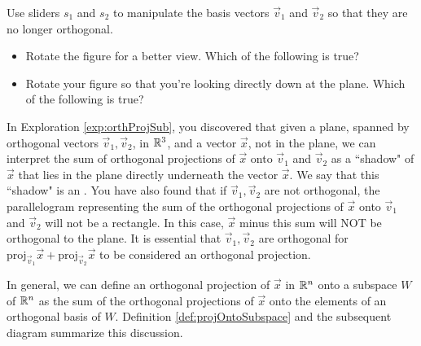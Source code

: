 \documentclass{ximera}
\begin{document}
\begin{exploration}
 \begin{question}
 Use sliders $s_1$ and $s_2$ to manipulate the basis vectors $\vec{v}_1$ and $\vec{v}_2$ so that they are no longer orthogonal.  

\begin{itemize}
 \item 
 Rotate the figure for a better view.  Which of the following is true?
 \begin{multipleChoice}
 \end{multipleChoice}
 \item
 Rotate your figure so that you're looking directly down at the plane. Which of the following is true?
 \begin{multipleChoice}
 \end{multipleChoice}
\end{itemize}
\end{question}
\end{exploration}

In Exploration \ref{exp:orthProjSub}, you discovered that given a plane, spanned by orthogonal vectors $\vec{v}_1,\vec{v}_2$, in $\mathbb{R}^3$, and a vector $\vec{x}$, not in the plane, we can interpret the sum of orthogonal projections of $\vec{x}$ onto $\vec{v}_1$ and $\vec{v}_2$ as a ``shadow" of $\vec{x}$ that lies in the plane directly underneath the vector $\vec{x}$. We say that this ``shadow" is an . You have also found that if $\vec{v}_1,\vec{v}_2$ are not orthogonal, the parallelogram representing the sum of the orthogonal projections of $\vec{x}$ onto $\vec{v}_1$ and $\vec{v}_2$ will not be a rectangle.  In this case, $\vec{x}$ minus this sum will NOT be orthogonal to the plane.  It is essential that $\vec{v}_1,\vec{v}_2$ are orthogonal for $\mbox{proj}_{\vec{v}_1}\vec{x}+\mbox{proj}_{\vec{v}_2}\vec{x}$ to be considered an orthogonal projection.  

In general, we can define an orthogonal projection of $\vec{x}$ in $\mathbb{R}^n$ onto a subspace $W$ of $\mathbb{R}^n$ as the sum of the orthogonal projections of $\vec{x}$ onto the elements of an orthogonal basis of $W$.  %
Definition \ref{def:projOntoSubspace} and the subsequent diagram summarize this discussion.
\end{document}
